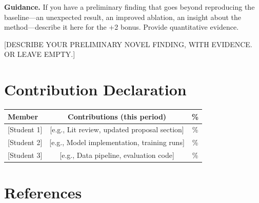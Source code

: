 \documentclass[11pt, letterpaper]{article}
\begin{document}
\begin{guidancebox}
\textbf{Guidance.} If you have a preliminary finding that goes beyond
reproducing the baseline---an unexpected result, an improved ablation,
an insight about the method---describe it here for the +2 bonus.
Provide quantitative evidence.
\end{guidancebox}

[DESCRIBE YOUR PRELIMINARY NOVEL FINDING, WITH EVIDENCE. OR LEAVE EMPTY.]

\section{Contribution Declaration}

\begin{tabular}{lcc}
\toprule
\textbf{Member} & \textbf{Contributions (this period)} & \textbf{\%} \\
\midrule
{[Student 1]} & [e.g., Lit review, updated proposal section] & \% \\
{[Student 2]} & [e.g., Model implementation, training runs] & \% \\
{[Student 3] }& [e.g., Data pipeline, evaluation code] & \% \\
\bottomrule
\end{tabular}

\section{References}

\begin{enumerate}[label={[\arabic*]},leftmargin=*]
  \item [Author(s), Year. ``Title.'' \textit{Venue}. arXiv:XXXX.XXXXX]
  \item [\ldots]
\end{enumerate}
\end{document}
